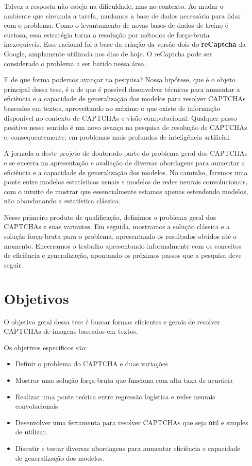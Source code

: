 \documentclass[12pt,]{report}
\providecommand{\tightlist}{%
  \setlength{\itemsep}{0pt}\setlength{\parskip}{0pt}}
\begin{document}
Talvez a resposta não esteja na dificuldade, mas no contexto. Ao mudar o ambiente que circunda a tarefa, mudamos a base de dados necessária para lidar com o problema. Como o levantamento de novas bases de dados de treino é custosa, essa estratégia torna a resolução por métodos de força-bruta inexequíveis. Esse racional foi a base da criação da versão dois do \textbf{reCaptcha} da Google, amplamente utilizada nos dias de hoje. O reCaptcha pode ser considerado o problema a ser batido nessa área.

E de que forma podemos avançar na pesquisa? Nossa hipótese, que é o objeto principal dessa tese, é a de que é possível desenvolver técnicas para aumentar a eficiência e a capacidade de generalização dos modelos para resolver CAPTCHAs baseados em textos, aproveitando ao máximo o que existe de informação disponível no contexto de CAPTCHAs e visão computacional. Qualquer passo positivo nesse sentido é um novo avanço na pesquisa de resolução de CAPTCHAs e, consequentemente, em problemas mais profundos de inteligência artificial.

A jornada a deste projeto de doutorado parte do problema geral dos CAPTCHAs e se encerra na apresentação e avaliação de diversas abordagens para aumentar a eficiência e a capacidade de generalização dos modelos. No caminho, faremos uma ponte entre modelos estatísticos usuais e modelos de redes neurais convolucionais, com o intuito de mostrar que essencialmente estamos apenas estendendo modelos, não abandonando a estatística clássica.

Nesse primeiro produto de qualificação, definimos o problema geral dos CAPTCHAs e suas variantes. Em seguida, mostramos a solução clássica e a solução força-bruta para o problema, apresentando os resultados obtidos até o momento. Encerramos o trabalho apresentando informalmente com os conceitos de eficiência e generalização, apontando os próximos passos que a pesquisa deve seguir.

\hypertarget{objetivos}{%
\section{Objetivos}\label{objetivos}}

O objetivo geral dessa tese é buscar formas eficientes e gerais de resolver CAPTCHAs de imagens baseados em textos.

Os objetivos específicos são:

\begin{itemize}
\tightlist
\item
  Definir o problema do CAPTCHA e duas variações
\item
  Mostrar uma solução força-bruta que funciona com alta taxa de acurácia
\item
  Realizar uma ponte teórica entre regressão logística e redes neurais convolucionais
\item
  Desenvolver uma ferramenta para resolver CAPTCHAs que seja útil e simples de utilizar.
\item
  Discutir e testar diversas abordagens para aumentar eficiência e capacidade de generalização dos modelos.
\end{itemize}
\end{document}
